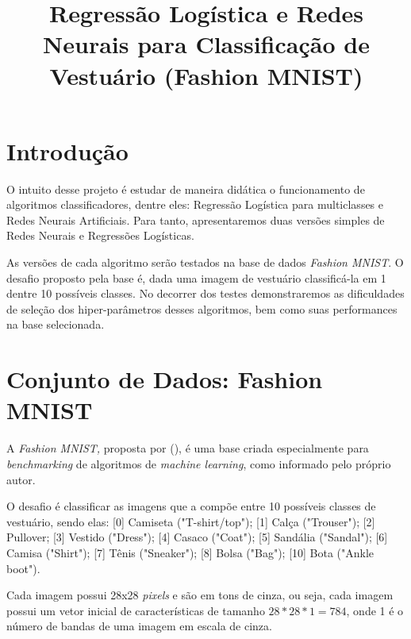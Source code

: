 \documentclass[conference]{IEEEtran}
\begin{document}
\renewcommand{\figurename}{Fig.}
\renewcommand{\refname}{Referências}

\title{Regressão Logística e Redes Neurais para Classificação de Vestuário (Fashion MNIST)}

\author{
\and
{}
}

\maketitle

\section{Introdução}	

	O intuito desse projeto é estudar de maneira didática o funcionamento  de algoritmos classificadores, dentre eles: Regressão Logística para multiclasses e Redes Neurais Artificiais. Para tanto, apresentaremos duas versões simples de Redes Neurais e Regressões Logísticas. 
	
	As versões de cada algoritmo serão testados na base de dados \textit{Fashion MNIST}. O desafio proposto pela base é, dada uma imagem de vestuário classificá-la em 1 dentre 10 possíveis classes. No decorrer dos testes demonstraremos as dificuldades de seleção dos hiper-parâmetros desses algoritmos, bem como suas performances na base selecionada.
	
\section{Conjunto de Dados: Fashion MNIST}

	A\textit{ Fashion MNIST,} proposta por \citeauthor{xiao2017/online} (\citeyear{xiao2017/online}), é uma base criada especialmente para \textit{benchmarking} de algoritmos de \textit{machine learning}, como informado pelo próprio autor.
	
	O desafio é classificar as imagens que a compõe entre 10 possíveis classes de vestuário, sendo elas: [0] Camiseta ("T-shirt/top"); [1] Calça ("Trouser"); [2] Pullover; [3] Vestido ("Dress"); [4] Casaco ("Coat"); [5] Sandália ("Sandal"); [6] Camisa ("Shirt"); [7] Tênis ("Sneaker"); [8] Bolsa ("Bag"); [10] Bota ("Ankle boot").
	
	Cada imagem possui 28x28 \textit{pixels} e são em tons de cinza, ou seja, cada imagem possui um vetor inicial de características de tamanho $28*28*1 = 784$, onde 1 é o número de bandas de uma imagem em escala de cinza.
	
\end{document}
